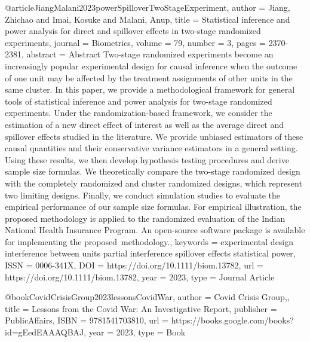 {{@article{JiangMalani2023powerSpilloverTwoStageExperiment,
   author = {Jiang, Zhichao and Imai, Kosuke and Malani, Anup},
   title = {Statistical inference and power analysis for direct and spillover effects in two-stage randomized experiments},
   journal = {Biometrics},
   volume = {79},
   number = {3},
   pages = {2370-2381},
   abstract = {Abstract Two-stage randomized experiments become an increasingly popular experimental design for causal inference when the outcome of one unit may be affected by the treatment assignments of other units in the same cluster. In this paper, we provide a methodological framework for general tools of statistical inference and power analysis for two-stage randomized experiments. Under the randomization-based framework, we consider the estimation of a new direct effect of interest as well as the average direct and spillover effects studied in the literature. We provide unbiased estimators of these causal quantities and their conservative variance estimators in a general setting. Using these results, we then develop hypothesis testing procedures and derive sample size formulas. We theoretically compare the two-stage randomized design with the completely randomized and cluster randomized designs, which represent two limiting designs. Finally, we conduct simulation studies to evaluate the empirical performance of our sample size formulas. For empirical illustration, the proposed methodology is applied to the randomized evaluation of the Indian National Health Insurance Program. An open-source software package is available for implementing the proposed methodology.},
   keywords = {experimental design
interference between units
partial interference
spillover effects
statistical power},
   ISSN = {0006-341X},
   DOI = {https://doi.org/10.1111/biom.13782},
   url = {https://doi.org/10.1111/biom.13782},
   year = {2023},
   type = {Journal Article}
}


@book{CovidCrisisGroup2023lessonsCovidWar,
   author = {Covid Crisis Group,},
   title = {Lessons from the Covid War: An Investigative Report},
   publisher = {PublicAffairs},
   ISBN = {9781541703810},
   url = {https://books.google.com/books?id=gEedEAAAQBAJ},
   year = {2023},
   type = {Book}
}



}}
